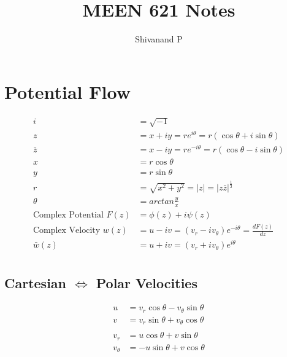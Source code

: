 \documentclass[10pt, letterpaper, notitlepage]{article}
\title{MEEN 621 Notes}
\author{Shivanand P}
\begin{document}
\sffamily
\sffamily{}

\maketitle
\renewcommand{\cftpartleader}{\cftdotfill{\cftdotsep}} %
\renewcommand{\cftsecleader}{\cftdotfill{\cftdotsep}}
\tableofcontents
\pagestyle{empty}

\newpage
\setcounter{page}{1}

\pagestyle{fancy}
\fancyhead{}    
\fancyfoot{}
\renewcommand{\headrulewidth}{0pt}
\renewcommand{\footrulewidth}{0pt}
\renewcommand{\arraystretch}{1.75}

\section{Potential Flow}
\begin{align*}
i &= \sqrt{-1} \\
z &= x + i y = r e^{i \theta} = r (\cos{\theta} + i \sin{\theta}) \\
\bar{z} &= x - i y = r e^{-i \theta} = r (\cos{\theta} - i \sin{\theta}) \\
x &= r \cos{\theta} \\
y &= r \sin{\theta} \\
r &= \sqrt{x^2 + y^2} = |z| = |z \bar{z}|^{\frac{1}{2}} \\
\theta &= arctan{\frac{y}{x}} \\
\text{Complex Potential\ } F(z) &= \phi(z) + i \psi(z) \\
\text{Complex Velocity\ } w(z) &= u - i v = (v_r - i v_{\theta}) e^{-i \theta} = \frac{dF(z)}{dz} \\
\bar{w}(z) &= u + i v = (v_r + i v_{\theta}) e^{i \theta} \\
\end{align*}

\subsection{Cartesian $\Leftrightarrow$ Polar Velocities}
\begin{align*}
u &= v_r \cos{\theta} - v_{\theta} \sin{\theta} \\
v &= v_r \sin{\theta} + v_{\theta} \cos{\theta} \\ \\
v_r &= u \cos{\theta} + v \sin{\theta} \\
v_{\theta} &= -u \sin{\theta} + v \cos{\theta} \\
\end{align*}
\end{document}

